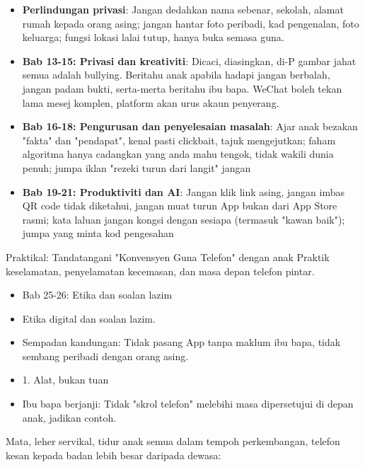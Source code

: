 \begin{itemize}
  \item \textbf{Perlindungan privasi}: Jangan dedahkan nama sebenar, sekolah, alamat rumah kepada orang asing; jangan hantar foto peribadi, kad pengenalan, foto keluarga; fungsi lokasi lalai tutup, hanya buka semasa guna.
  \item \textbf{Bab 13-15: Privasi dan kreativiti}: Dicaci, diasingkan, di-P gambar jahat semua adalah bullying. Beritahu anak apabila hadapi jangan berbalah, jangan padam bukti, serta-merta beritahu ibu bapa. WeChat boleh tekan lama mesej komplen, platform akan urus akaun penyerang.
  \item \textbf{Bab 16-18: Pengurusan dan penyelesaian masalah}: Ajar anak bezakan "fakta" dan "pendapat", kenal pasti clickbait, tajuk mengejutkan; faham algoritma hanya cadangkan yang anda mahu tengok, tidak wakili dunia penuh; jumpa iklan "rezeki turun dari langit" jangan
  \item \textbf{Bab 19-21: Produktiviti dan AI}: Jangan klik link asing, jangan imbas QR code tidak diketahui, jangan muat turun App bukan dari App Store rasmi; kata laluan jangan kongsi dengan sesiapa (termasuk "kawan baik"); jumpa yang minta kod pengesahan
\end{itemize}

\begin{tcbpractice}{Praktikal: Tandatangani "Konvensyen Guna Telefon" dengan anak}
Praktik keselamatan, penyelamatan kecemasan, dan masa depan telefon pintar.

\begin{itemize}
  \item Bab 25-26: Etika dan soalan lazim
  \item Etika digital dan soalan lazim.
  \item Sempadan kandungan: Tidak pasang App tanpa maklum ibu bapa, tidak sembang peribadi dengan orang asing.
  \item 1. Alat, bukan tuan
  \item Ibu bapa berjanji: Tidak "skrol telefon" melebihi masa dipersetujui di depan anak, jadikan contoh.
\end{itemize}

\end{tcbpractice}


Mata, leher servikal, tidur anak semua dalam tempoh perkembangan, telefon kesan kepada badan lebih besar daripada dewasa:

